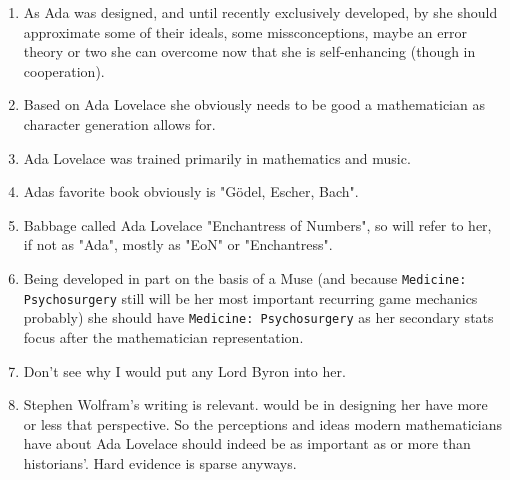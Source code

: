 
\begin{enumerate}
    \item As \gls{Ada} was designed, and until recently exclusively developed, by \egr{} she should approximate some of their ideals, some missconceptions, maybe an error theory or two she can overcome now that she is self-enhancing (though in cooperation).
    \item Based on Ada Lovelace she obviously needs to be good a mathematician as character generation allows for.
    \item Ada Lovelace was trained primarily in mathematics and music.
    \item \gls{Ada}s favorite book obviously is "Gödel, Escher, Bach".
    \item Babbage called Ada Lovelace "Enchantress of Numbers", so \egr{} will refer to her, if not as "Ada", mostly as "EoN" or "Enchantress".
    \item Being developed in part on the basis of a \gls{Muse} (and because \texttt{Medicine: Psychosurgery} still will be her most important recurring game mechanics probably) she should have \texttt{Medicine: Psychosurgery} as her secondary stats focus after the mathematician representation.
    \item Don't see why I would put any Lord Byron into her.
    \item Stephen Wolfram's writing  is relevant. \egr{} would be in designing her have more or less that perspective. So the perceptions and ideas modern mathematicians have about Ada Lovelace should indeed be as important as or more than historians'. Hard evidence is sparse anyways.
\end{enumerate}